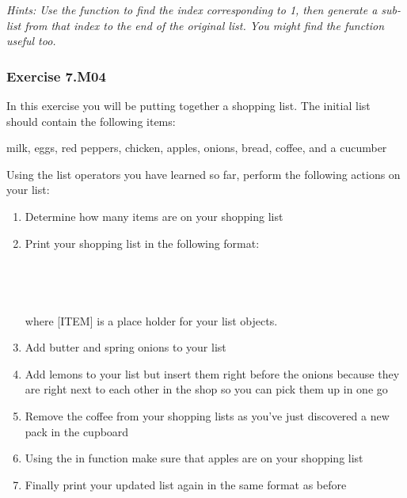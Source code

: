 \textit{Hints:
Use the {} function to find the index corresponding to 1, then generate a sub-list from that index to the end of the original list. You might find the {} function useful too.}\\[1cm]




\subsubsection*{Exercise 7.M04}
In this exercise you will be putting together a shopping list. The initial list should contain the following items:\\
\begin{center}
milk, eggs, red peppers, chicken, apples, onions, bread, coffee, and a cucumber
\end{center}
Using the list operators you have learned so far, perform the following actions on your list:
\begin{enumerate}[label=(\alph*)]
	\item Determine how many items are on your shopping list
	\item Print your shopping list in the following format:\\
{}\\
\hspace*{5mm}{\code{- [ITEM]}}\\
\hspace*{5mm}{\code{- [ITEM]}}\\
\\
where [ITEM] is a place holder for your list objects.
	\item Add butter and spring onions to your list
	\item Add lemons to your list but insert them right before the onions because they are
right next to each other in the shop so you can pick them up in one go
	\item Remove the coffee from your shopping lists as you’ve just discovered a new pack in
the cupboard
	\item Using the in function make sure that apples are on your shopping list
	\item Finally print your updated list again in the same format as before\\
\end{enumerate}



